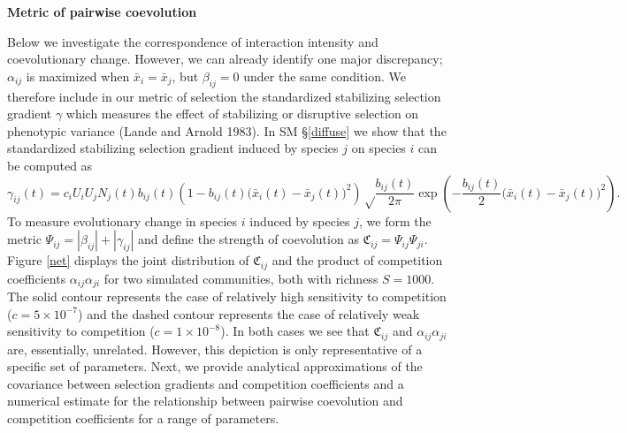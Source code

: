 \documentclass[]{article}
\begin{document}
\textbf{Metric of pairwise coevolution}

Below we investigate the correspondence of interaction intensity and
coevolutionary change. However, we can already identify one major
discrepancy; \(\alpha_{ij}\) is maximized when \(\bar x_i=\bar x_j\),
but \(\beta_{ij}=0\) under the same condition. We therefore include in
our metric of selection the standardized stabilizing selection gradient
\(\gamma\) which measures the effect of stabilizing or disruptive
selection on phenotypic variance (Lande and Arnold 1983). In SM
\S\ref{diffuse} we show that the standardized stabilizing selection
gradient induced by species \(j\) on species \(i\) can be computed as
\begin{equation}
\gamma_{ij}(t)=c_iU_iU_jN_j(t)b_{ij}(t)\left(1-b_{ij}(t)\big(\bar x_i(t)-\bar x_j(t)\big)^2\right) \sqrt\frac{b_{ij}(t)}{2\pi}\exp\left(-\frac{b_{ij}(t)}{2}\big(\bar x_i(t)-\bar x_j(t)\big)^2\right).
\end{equation} To measure evolutionary change in species \(i\) induced
by species \(j\), we form the metric
\(\Psi_{ij}=|\beta_{ij}|+|\gamma_{ij}|\) and define the strength of
coevolution as \(\mathfrak{C}_{ij}=\Psi_{ij}\Psi_{ji}\). Figure
\ref{net} displays the joint distribution of \(\mathfrak{C}_{ij}\) and
the product of competition coefficients \(\alpha_{ij}\alpha_{ji}\) for
two simulated communities, both with richness \(S=1000\). The solid
contour represents the case of relatively high sensitivity to
competition (\(c=5\times10^{-7}\)) and the dashed contour represents the
case of relatively weak sensitivity to competition
(\(c=1\times10^{-8}\)). In both cases we see that \(\mathfrak{C}_{ij}\)
and \(\alpha_{ij}\alpha_{ji}\) are, essentially, unrelated. However,
this depiction is only representative of a specific set of parameters.
Next, we provide analytical approximations of the covariance between
selection gradients and competition coefficients and a numerical
estimate for the relationship between pairwise coevolution and
competition coefficients for a range of parameters.
\end{document}
